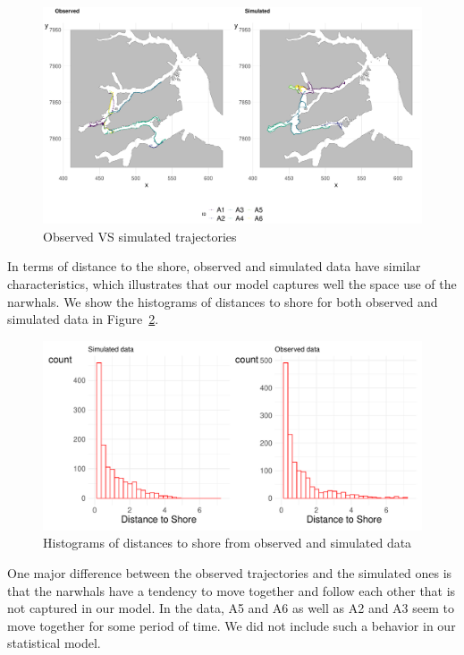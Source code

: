 \documentclass[aoas]{imsart}
\theoremstyle{definition}
\theoremstyle{remark}
\theoremstyle{remark}
\newcommand {\1}{\mathbb{1}}
\begin{document}
\begin{figure}
\centering
    \includegraphics[scale=0.4]{images/application/baseline/plot_baseline_crcvm2_trajectory.pdf}
     \caption{Observed VS simulated trajectories}
    \label{fig: simulated data}
   
\end{figure}

In terms of distance to the shore, observed and simulated data have similar characteristics, which illustrates that our model captures well the space use of the narwhals. We show the histograms of distances to shore for both observed and simulated data in Figure~\ref{fig: Dshore histograms}.


\begin{figure}
\centering
    \includegraphics[scale=0.4]{images/application/baseline/Dshore_histograms.pdf}
     \caption{Histograms of distances to shore from observed and simulated data}
    \label{fig: Dshore histograms}
   
\end{figure}


One major difference between the observed trajectories and the simulated ones is that the narwhals have a tendency to move together and follow each other that is not captured in our model. In the data, A5 and A6 as well as A2 and A3 seem to move together for some period of time. We did not include such a behavior in our statistical model.
\end{document}
